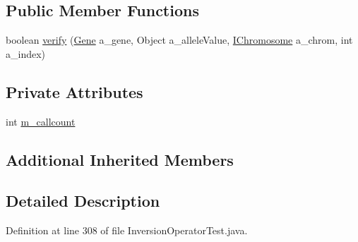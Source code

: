 \subsection*{Public Member Functions}
\begin{DoxyCompactItemize}
\item 
boolean \hyperlink{classorg_1_1jgap_1_1impl_1_1_inversion_operator_test_1_1_test_constraint_checker_a6703ea3de4ce47ab66aba777f680877b}{verify} (\hyperlink{interfaceorg_1_1jgap_1_1_gene}{Gene} a\-\_\-gene, Object a\-\_\-allele\-Value, \hyperlink{interfaceorg_1_1jgap_1_1_i_chromosome}{I\-Chromosome} a\-\_\-chrom, int a\-\_\-index)
\end{DoxyCompactItemize}
\subsection*{Private Attributes}
\begin{DoxyCompactItemize}
\item 
int \hyperlink{classorg_1_1jgap_1_1impl_1_1_inversion_operator_test_1_1_test_constraint_checker_a01841f6cbcaf8d58b6a02c94d5ec9c15}{m\-\_\-callcount}
\end{DoxyCompactItemize}
\subsection*{Additional Inherited Members}


\subsection{Detailed Description}


Definition at line 308 of file Inversion\-Operator\-Test.\-java.



